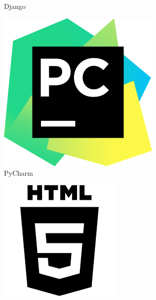 \begin{figure}[!tbp]
\begin{subfigure}[b]{0.1\textwidth}
		\caption{Django}
	\end{subfigure}
	\hfill
	\begin{subfigure}[b]{0.1\textwidth}
		\includegraphics[width=\textwidth, height=\textwidth]{imagenes/software_usado/pycharm_logo.png}
		\caption{PyCharm}
	\end{subfigure}
	\newline
	\begin{subfigure}[b]{0.10\textwidth}
		\includegraphics[width=\textwidth, height=\textwidth]{imagenes/software_usado/icono_html.png}

\end{subfigure}
\end{figure}

